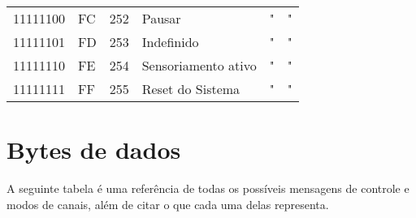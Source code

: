 \begin{center}
\begin{supertabular}{| C{2cm} | C{1.5cm} | C{1.5cm} | C{5.3cm} | C{1.5cm} | C{1.5cm} |}
             11111100 & FC & 252 &                  Pausar                         &                 "                    &                   "                  \\
                11111101 & FD & 253 &                 Indefinido                      &                 "                    &                   "                  \\
             11111110 & FE & 254 &             Sensoriamento ativo                 &                 "                    &                   "                  \\
                11111111 & FF & 255 &               Reset do Sistema                  &                 "                    &                   "                  \\
        \end{supertabular}
        \end{center}

    \section{Bytes de dados}

        A seguinte tabela é uma referência de todas os possíveis mensagens de controle e modos de canais, além de citar o que cada uma delas representa.


